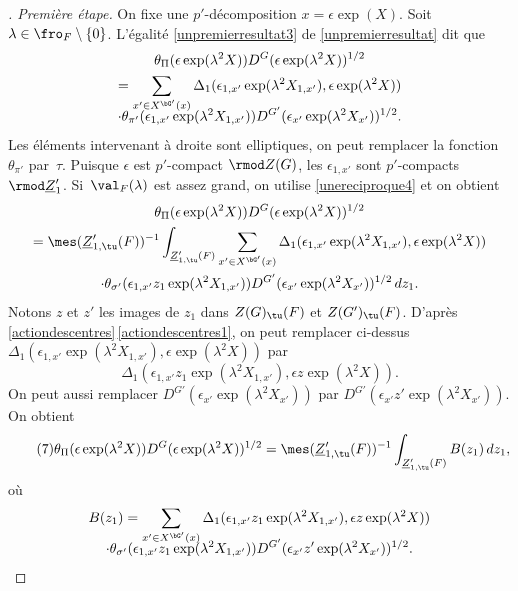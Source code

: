 \begin{proof}[\proofname. Première étape]
On fixe une $p'$-décomposition $x=\epsilon \exp(X)$. Soit $\lambda\in \fro_{F}\setminus\{0\}$.
L'égalité \eqref{unpremierresultat3} de \ref{unpremierresultat} dit que
\begin{multline*}
\theta_{\Pi}( \epsilon \exp(\lambda^2X))D^G(\epsilon \exp(\lambda^2X))^{1/2}\\
=\sum_{x'\in X^{\bG'}(x)}\Delta_{1}(\epsilon_{1,x'}\exp(\lambda^2X_{1,x'}),\epsilon \exp(\lambda^2X))
\\[-8pt]
\cdot\theta_{\pi'}(\epsilon_{1,x'}\exp(\lambda^2X_{1,x'}))D^{G'}(\epsilon_{x'}\exp(\lambda^2X_{x'}))^{1/2}.
\end{multline*}
Les éléments intervenant à droite sont elliptiques, on peut remplacer la fonction~$\theta_{\pi'}$ par~$\tau$. Puisque $\epsilon$ est $p'$-compact $\rmod Z(G)$, les $\epsilon_{1,x'}$ sont $p'$-compacts $\rmod \underline{Z}'_{1}$. Si~$\val_{F}(\lambda)$ est assez grand, on utilise \eqref{unereciproque4} et on obtient
\begin{multline*}
\theta_{\Pi}( \epsilon \exp(\lambda^2X))D^G(\epsilon \exp(\lambda^2X))^{1/2}\\
=\mes(\underline{Z}'_{1,\tu}(F))^{-1}\int_{\underline{Z}'_{1,\tu}(F)}\sum_{x'\in X^{\bG'}(x)} \Delta_{1}(\epsilon_{1,x'}\exp(\lambda^2X_{1,x'}),\epsilon \exp(\lambda^2X))\\
\cdot\theta_{\sigma'}(\epsilon_{1,x'}z_{1}\exp(\lambda^2X_{1,x'}))D^{G'}(\epsilon_{x'}\exp(\lambda^2X_{x'}))^{1/2}\,dz_{1}.
\end{multline*}
Notons $z$ et $z'$ les images de $z_{1}$ dans $Z(G)_{\tu}(F)$ et $ Z(G')_{\tu}(F)$. D'après \ref{actiondescentres}\,\eqref{actiondescentres1}, on peut remplacer ci-dessus $\Delta_{1}(\epsilon_{1,x'}\exp(\lambda^2X_{1,x'}),\epsilon \exp(\lambda^2X))$ par
\[
\Delta_{1}(\epsilon_{1,x'}z_{1}\exp(\lambda^2X_{1,x'}),\epsilon z \exp(\lambda^2X)).
\]
On peut aussi remplacer $D^{G'}(\epsilon_{x'}\exp(\lambda^2X_{x'}))$ par $D^{G'}(\epsilon_{x'}z'\exp(\lambda^2X_{x'}))$. On obtient%
\begin{equation}\tag{7}\label{unereciproque7}
\theta_{\Pi}( \epsilon \exp(\lambda^2X))D^G(\epsilon \exp(\lambda^2X))^{1/2}=\mes(\underline{Z}'_{1,\tu}(F))^{-1}\int_{\underline{Z}'_{1,\tu}(F)}B(z_{1})\,dz_{1},
\end{equation}
où
\begin{multline*}
B(z_{1})=\sum_{x'\in X^{\bG'}(x)}\Delta_{1}(\epsilon_{1,x'}z_{1}\exp(\lambda^2X_{1,x'}),\epsilon z \exp(\lambda^2X))
\\[-8pt]
\cdot\theta_{\sigma'}(\epsilon_{1,x'}z_{1}\exp(\lambda^2X_{1,x'}))D^{G'}(\epsilon_{x'}z'\exp(\lambda^2X_{x'}))^{1/2}.

\end{multline*}
\end{proof}
